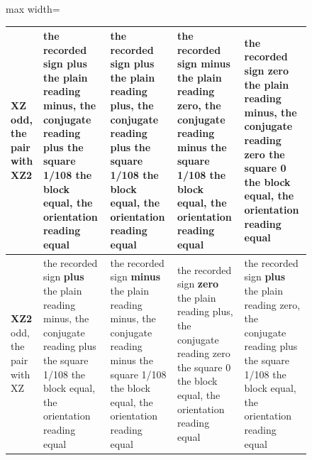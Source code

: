 \begin{chproof}
\begin{figure}[htbp]
{\begin{adjustbox}{max width=\linewidth}
\begin{tabular}{|p{30mm}|p{28mm}|p{28mm}|p{28mm}|p{28mm}|}
\textbf{XZ} \newline odd, the pair with XZ2 & the recorded sign \textbf{plus} \newline the plain reading minus, the conjugate reading plus \newline the square 1/108 \newline the block equal, the orientation reading equal & the recorded sign \textbf{plus} \newline the plain reading plus, the conjugate reading plus \newline the square 1/108 \newline the block equal, the orientation reading equal & the recorded sign \textbf{minus} \newline the plain reading zero, the conjugate reading minus \newline the square 1/108 \newline the block equal, the orientation reading equal & the recorded sign \textbf{zero} \newline the plain reading minus, the conjugate reading zero \newline the square 0 \newline the block equal, the orientation reading equal \\ \hline
\textbf{XZ2} \newline odd, the pair with XZ & the recorded sign \textbf{plus} \newline the plain reading minus, the conjugate reading plus \newline the square 1/108 \newline the block equal, the orientation reading equal & the recorded sign \textbf{minus} \newline the plain reading minus, the conjugate reading minus \newline the square 1/108 \newline the block equal, the orientation reading equal & the recorded sign \textbf{zero} \newline the plain reading plus, the conjugate reading zero \newline the square 0 \newline the block equal, the orientation reading equal & the recorded sign \textbf{plus} \newline the plain reading zero, the conjugate reading plus \newline the square 1/108 \newline the block equal, the orientation reading equal \\ \hline

\end{tabular}
\end{adjustbox}}
\end{figure}
\end{chproof}
